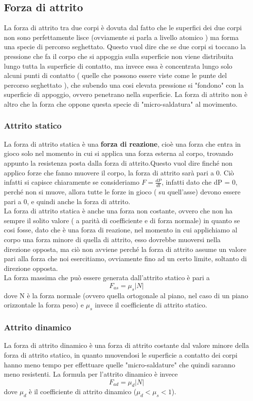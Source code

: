 \documentclass[portait]{article}
\begin{document}
\subsection{Forza di attrito}
La forza di attrito tra due corpi è dovuta dal fatto che le superfici dei due corpi non sono perfettamente lisce (ovviamente si parla a livello atomico ) ma forma una specie di percorso seghettato. Questo vuol dire che se due corpi si toccano la pressione che fa il corpo che si appoggia sulla superficie non viene distribuita lungo tutta la superficie di contatto, ma invece essa è concentrata lungo solo alcuni punti di contatto ( quelle che possono essere viste come le punte del percorso seghettato ), che subendo una cosi elevata pressione si "fondono" con la superficie di appoggio, ovvero penetrano nella superficie. La forza di attrito non è altro che la forza che oppone questa specie di "micro-saldatura" al movimento. \\ 
\subsubsection{Attrito statico}
La forza di attrito statica è una \textbf{forza di reazione}, cioè una forza che entra in gioco solo nel momento in cui si applica una forza esterna al corpo, trovando appunto la resistenza posta dalla forza di attrito.Questo vuol dire finché non applico forze che fanno muovere il corpo, la forza di attrito sarà pari a 0. Ciò infatti si capisce chiaramente se consideriamo $F = \frac{dP}{dt}$, infatti dato che dP = 0, perché non si muove, allora tutte le forze in gioco ( su quell'asse) devono essere pari a 0, e quindi anche la forza di attrito.\\
La forza di attrito statica è anche una forza non costante, ovvero che non ha sempre il solito valore ( a parità di coefficiente e di forza normale) in quanto se cosi fosse, dato che è una forza di reazione, nel momento in cui applichiamo al corpo una forza minore di quella di attrito, esso dovrebbe muoversi nella direzione opposta, ma ciò non avviene perché la forza di attrito assume un valore pari alla forza che noi esercitiamo, ovviamente fino ad un certo limite, soltanto di direzione opposta. \\
La forza massima che può essere generata dall'attrito statico è pari a 
$$F_{as} =\mu_s |N| $$
dove N è la forza normale (ovvero quella ortogonale al piano, nel caso di un piano orizzontale la forza peso) e $\mu_s$ invece il coefficiente di attrito statico.
\subsubsection{Attrito dinamico}
La forza di attrito dinamico è una forza di attrito costante dal valore minore della forza di attrito statico, in quanto muovendosi le superficie a contatto dei corpi hanno meno tempo per effettuare quelle "micro-saldature" che quindi saranno meno resistenti. La formula per l'attrito dinamico è invece 
$$F_{ad} = \mu_d|N|$$
dove $\mu_d$ è il coefficiente di attrito dinamico ($\mu_d < \mu_s < 1$).
\end{document}
